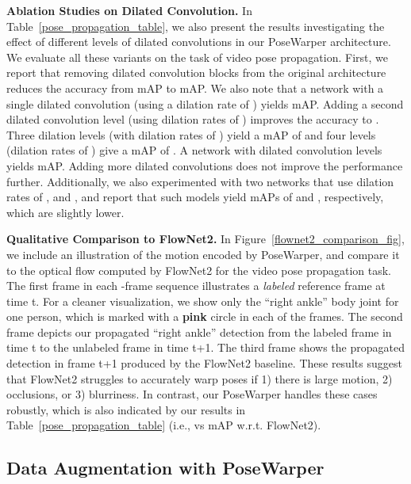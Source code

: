 \documentclass{article}
\begin{document}
\textbf{Ablation Studies on Dilated Convolution.} In Table~\ref{pose_propagation_table}, we also present the results investigating the effect of different levels of dilated convolutions in our PoseWarper architecture. We evaluate all these variants on the task of video pose propagation. First, we report that removing dilated convolution blocks from the original architecture reduces the accuracy from  mAP to  mAP. We also note that a network with a single dilated convolution (using a dilation rate of ) yields  mAP.  Adding a second dilated convolution level (using dilation rates of ) improves the accuracy to .  Three dilation levels (with dilation rates of ) yield a mAP of  and four levels (dilation rates of ) give a mAP of . A network with  dilated convolution levels yields  mAP. Adding more dilated convolutions does not improve the performance further. Additionally, we also experimented with two networks that use dilation rates of , and , and report that such models yield mAPs of  and , respectively, which are slightly lower.




\textbf{Qualitative Comparison to FlowNet2.} In Figure~\ref{flownet2_comparison_fig}, we include an illustration of the motion encoded by PoseWarper, and compare it to the optical flow computed by FlowNet2 for the video pose propagation task. The first frame in each -frame sequence illustrates a {\em labeled} reference frame at time t. For a cleaner visualization, we show only the ``right ankle'' body joint for one person, which is marked with a \textbf{{\color{RubineRed} pink}} circle in each of the frames. The second frame depicts our propagated ``right ankle'' detection from the labeled frame in time t to the unlabeled frame in time t+1. The third frame shows the propagated detection in frame t+1 produced by the FlowNet2 baseline. These results suggest that FlowNet2 struggles to accurately warp poses if 1) there is large motion, 2) occlusions, or 3) blurriness. In contrast, our PoseWarper handles these cases robustly, which is also indicated by our results in Table~\ref{pose_propagation_table} (i.e.,  vs  mAP w.r.t. FlowNet2).

 
\subsection{Data Augmentation with PoseWarper}
\end{document}
